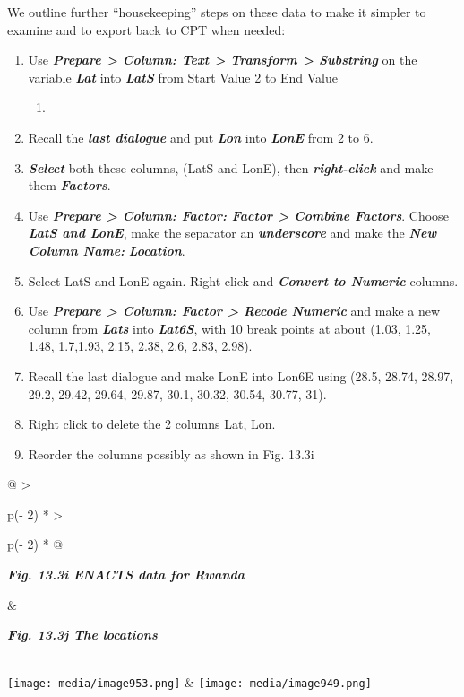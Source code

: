 \documentclass[
  letterpaper,
  DIV=11,
  numbers=noendperiod]{scrreprt}
\providecommand{\tightlist}{%
  \setlength{\itemsep}{0pt}\setlength{\parskip}{0pt}}\usepackage{longtable,booktabs,array}
\begin{document}
We outline further ``housekeeping'' steps on these data to make it
simpler to examine and to export back to CPT when needed:

\begin{enumerate}
\def\labelenumi{\alph{enumi})}
\item
  Use \textbf{\emph{Prepare \textgreater{} Column: Text \textgreater{}
  Transform \textgreater{} Substring}} on the variable
  \textbf{\emph{Lat}} into \textbf{\emph{LatS}} from Start Value 2 to
  End Value

  \begin{enumerate}
  \def\labelenumii{\arabic{enumii}.}
  \setcounter{enumii}{4}
  \tightlist
  \item
  \end{enumerate}
\item
  Recall the \textbf{\emph{last dialogue}} and put \textbf{\emph{Lon}}
  into \textbf{\emph{LonE}} from 2 to 6.
\item
  \textbf{\emph{Select}} both these columns, (LatS and LonE), then
  \textbf{\emph{right-click}} and make them \textbf{\emph{Factors}}.
\item
  Use \textbf{\emph{Prepare \textgreater{} Column: Factor: Factor
  \textgreater{} Combine Factors}}. Choose \textbf{\emph{LatS and
  LonE}}, make the separator an \textbf{\emph{underscore}} and make the
  \textbf{\emph{New Column Name:}} \textbf{\emph{Location}}.
\item
  Select LatS and LonE again. Right-click and \textbf{\emph{Convert to
  Numeric}} columns.
\item
  Use \textbf{\emph{Prepare \textgreater{} Column: Factor \textgreater{}
  Recode Numeric}} and make a new column from \textbf{\emph{Lats}} into
  \textbf{\emph{Lat6S}}, with 10 break points at about (1.03, 1.25,
  1.48, 1.7,1.93, 2.15, 2.38, 2.6, 2.83, 2.98).
\item
  Recall the last dialogue and make LonE into Lon6E using (28.5, 28.74,
  28.97, 29.2, 29.42, 29.64, 29.87, 30.1, 30.32, 30.54, 30.77, 31).
\item
  Right click to delete the 2 columns Lat, Lon.
\item
  Reorder the columns possibly as shown in Fig. 13.3i
\end{enumerate}

\begin{longtable}[]{@{}
  >{\raggedright\arraybackslash}p{(\columnwidth - 2\tabcolsep) * }
  >{\raggedright\arraybackslash}p{(\columnwidth - 2\tabcolsep) * }@{}}
\toprule\noalign{}
\begin{minipage}[b]{\linewidth}\raggedright
\textbf{\emph{Fig. 13.3i ENACTS data for Rwanda}}
\end{minipage} & \begin{minipage}[b]{\linewidth}\raggedright
\textbf{\emph{Fig. 13.3j The locations}}
\end{minipage} \\
\midrule\noalign{}
\endhead
\bottomrule\noalign{}
\endlastfoot
\texttt{[image: media/image953.png]} &
\texttt{[image: media/image949.png]} \\
\end{longtable}
\end{document}

